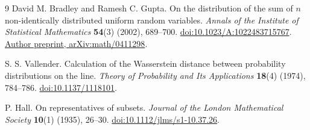 \documentclass[11pt,letterpaper]{article}
\theoremstyle{definition}
\theoremstyle{remark}
\begin{document}
\begin{thebibliography}{9}
David M. Bradley and Ramesh C. Gupta.
On the distribution of the sum of $n$ non-identically distributed uniform random variables.
\emph{Annals of the Institute of Statistical Mathematics} \textbf{54}(3) (2002), 689--700.
\href{https://doi.org/10.1023/A:1022483715767}{doi:10.1023/A:1022483715767}.
\href{https://arxiv.org/abs/math/0411298}{Author preprint, arXiv:math/0411298}.

S. S. Vallender.
Calculation of the Wasserstein distance between probability distributions on the line.
\emph{Theory of Probability and Its Applications} \textbf{18}(4) (1974), 784--786.
\href{https://doi.org/10.1137/1118101}{doi:10.1137/1118101}.

P. Hall.
On representatives of subsets.
\emph{Journal of the London Mathematical Society} \textbf{10}(1) (1935), 26--30.
\href{https://doi.org/10.1112/jlms/s1-10.37.26}{doi:10.1112/jlms/s1-10.37.26}.

\end{thebibliography}
\end{document}
